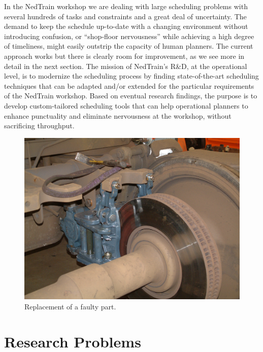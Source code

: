 		In the NedTrain workshop we are dealing with large scheduling problems 
		with several hundreds of tasks and constraints and a great deal of uncertainty.
		The demand to keep the schedule up-to-date with a changing environment without introducing confusion, 
		or ``shop-floor nervousness'' while achieving a high degree of timeliness,
		might easily outstrip the capacity of human planners.
		The current approach works but there is clearly room for improvement, as we see more in detail in the next section.
		The mission of NedTrain's R\&D, at the operational level, 
		is to modernize the scheduling process by finding state-of-the-art scheduling techniques 
		that can be adapted and/or extended for the particular requirements of the NedTrain workshop.
		Based on eventual research findings, the purpose is to develop custom-tailored scheduling tools that can help 
		operational planners to enhance punctuality and eliminate nervousness at the workshop, without sacrificing throughput.

		\begin{figure}
			\centering
			\includegraphics[height=0.3\textheight]{chapter/introduction/workshop-4}
			\caption{Replacement of a faulty part.}
			\label{fig-workshop-4}
		\end{figure}

\section{Research Problems}
\label{chapter:introduction:research-problems}

